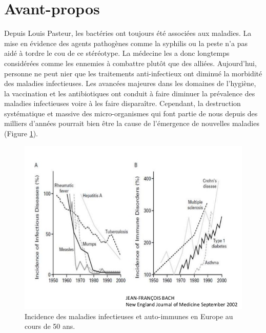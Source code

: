\documentclass[12pt,a4paper]{article}
\begin{document}
\newpage

\tableofcontents
\newpage


\section{Avant-propos}

Depuis Louis Pasteur, les bactéries ont toujours été associées aux maladies. La mise en évidence des agents pathogènes comme la syphilis ou la peste n'a pas aidé à tordre le cou de ce stéréotype. La médecine les a donc longtemps considérées comme les ennemies à combattre plutôt que des alliées.
Aujourd'hui, personne ne peut nier que les traitements anti-infectieux ont diminué la morbidité des maladies infectieuses.
Les avancées majeures dans les domaines de l'hygiène, la vaccination et les antibiotiques ont conduit à faire diminuer la prévalence des maladies infectieuses voire à les faire disparaître. Cependant, la destruction systématique et massive des micro-organismes qui font partie de nous depuis des milliers d'années pourrait bien être la cause de l'émergence de nouvelles maladies\cite{Bach2002} (Figure \ref{hyigienisme}).


\begin{figure}[ht]
\begin{center}
\includegraphics[scale=0.5]{img/allergie_infection.jpg}\hfill
\end{center}
\caption{Incidence des maladies infectieuses et auto-immunes en Europe au cours de 50 ans. }
\label{hyigienisme}
\end{figure}
\end{document}
